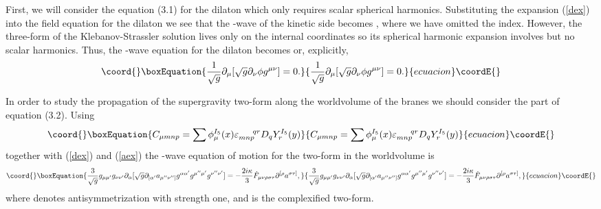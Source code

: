 \documentclass[12pt,epsf,a4paper]{article}
\begin{document}
First, we will consider the equation (3.1) for the dilaton which  only requires scalar spherical 
harmonics. Substituting the expansion 
(\ref{dex}) into the field equation for the dilaton we see that 
the \coordHE{}-wave of the kinetic side becomes \coordHE{}, 
where we have omitted the \coordHE{} index. However, the three-form of the Klebanov-Strassler 
solution \cite{KS} lives only on the internal coordinates so its spherical harmonic 
expansion involves \coordHE{} but no scalar harmonics. Thus, 
the \coordHE{}-wave equation for the dilaton becomes  
\coordHE{} or, explicitly,
\begin{equation}\coord{}\boxEquation{
\frac {1}{\sqrt{g}} \partial_{\mu} [ \sqrt{g} \partial_{\nu} \phi g^{\mu \nu} ] = 0. 
\label{dileq}
}{
\frac {1}{\sqrt{g}} \partial_{\mu} [ \sqrt{g} \partial_{\nu} \phi g^{\mu \nu} ] = 0. 
}{ecuacion}\coordE{}\end{equation}
  
In order to study the propagation of the supergravity two-form along the worldvolume of the 
branes we should consider the \coordHE{} part of equation 
(3.2). Using
\begin{equation}\coord{}\boxEquation{
C_{\mu m n p} = \sum \phi_{\mu}^{I_5} (x) \varepsilon_{mnp}^{\: \: \: \: \: \: \: \: qr} 
D_q Y_r^{I_5} (y)
}{
C_{\mu m n p} = \sum \phi_{\mu}^{I_5} (x) \varepsilon_{mnp}^{\: \: \: \: \: \: \: \: qr} 
D_q Y_r^{I_5} (y)
}{ecuacion}\coordE{}\end{equation}
together with  (\ref{dex}) and (\ref{aex})  the \coordHE{}-wave equation of motion 
for the two-form in the worldvolume  is
\begin{equation}\coord{}\boxEquation{
\frac {3}{\sqrt{g}} g_{\mu \mu'} g_{\nu \nu'} \partial_{\alpha} [ \sqrt{g} 
\partial_{[\alpha'} a_{\mu'' \nu'']} g^{\alpha \alpha'} g^{\mu'' \mu'} g^{\nu'' \nu'} ] 
= - \frac {2i \kappa}{3} {\dot F}_{\mu \nu \rho \sigma \tau} \partial^{[\rho} a^{\sigma \tau ]},
\label{aa}
}{
\frac {3}{\sqrt{g}} g_{\mu \mu'} g_{\nu \nu'} \partial_{\alpha} [ \sqrt{g} 
\partial_{[\alpha'} a_{\mu'' \nu'']} g^{\alpha \alpha'} g^{\mu'' \mu'} g^{\nu'' \nu'} ] 
= - \frac {2i \kappa}{3} {\dot F}_{\mu \nu \rho \sigma \tau} \partial^{[\rho} a^{\sigma \tau ]},
}{ecuacion}\coordE{}\end{equation}
where \myHighlight{$[ \: \: ]$}\coordHE{} denotes antisymmetrization with strength one, and \coordHE{} is the 
complexified two-form.
\end{document}
